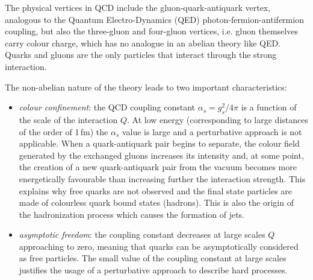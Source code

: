 The physical vertices in QCD include the gluon-quark-antiquark vertex, analogous to the Quantum Electro-Dynamics (QED) photon-fermion-antifermion coupling, but also the three-gluon and four-gluon vertices, i.e. gluon themselves carry colour charge, which has no analogue in an abelian theory like QED. Quarks and gluons are the only particles that interact through the strong interaction.

The non-abelian nature of the theory leads to two important characteristics:
\begin{itemize}
\item \emph{colour confinement}: the QCD coupling constant $\alpha_s = g_s^2/4\pi$ is a function of the scale of the interaction $Q$. At low energy (corresponding to large distances of the order of 1\,fm) the $\alpha_s$ value is large and a perturbative approach is not applicable. When a quark-antiquark pair begins to separate, the colour field generated by the exchanged gluons increases its intensity and, at some point, the creation of a new quark-antiquark pair from the vacuum becomes more energetically favourable than increasing further the interaction strength. This explains why free quarks are not observed and the final state particles are made of colourless quark bound states (hadrons). This is also the origin of the hadronization process which causes the formation of jets.

\item \emph{asymptotic freedom}: the coupling constant decreases at large scales $Q$ approaching to zero, meaning that quarks can be asymptotically considered as free particles. The small value of the coupling constant at large scales justifies the usage of a perturbative approach to describe hard processes.
\end{itemize}

